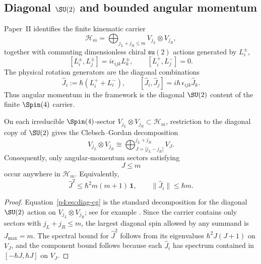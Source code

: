 \documentclass[12pt,a4paper]{article}
\begin{document}
\subsection{Diagonal \texorpdfstring{$\SU(2)$}{SU(2)} and bounded angular momentum}
\label{p4:sec:part2-angular}

Paper~II identifies the finite kinematic carrier
\[
\mathcal H_m
=
\bigoplus_{j_L+j_R\le m} V_{j_L}\otimes V_{j_R},
\]
together with commuting dimensionless chiral \(\mathfrak{su}(2)\) actions generated by \(L_i^\pm\),
\[
[L_i^\pm,L_j^\pm]=i\epsilon_{ijk}L_k^\pm,
\qquad
[L_i^+,L_j^-]=0.
\]
The physical rotation generators are the diagonal combinations
\begin{equation}
\label{p4:eq:Ji}
\hat J_i:=\hbar(L_i^+ + L_i^-),
\qquad
[\hat J_i,\hat J_j]=i\hbar\,\epsilon_{ijk}\hat J_k.
\end{equation}
Thus angular momentum in the framework is the diagonal \(\SU(2)\) content of the finite \(\Spin(4)\) carrier.

\begin{theorem}
\label{p4:thm:angular-cutoff}
On each irreducible \(\Spin(4)\)-sector \(V_{j_L}\otimes V_{j_R}\subset\mathcal H_m\),
restriction to the diagonal copy of \(\SU(2)\) gives the Clebsch--Gordan decomposition
\begin{equation}
\label{p4:eq:diag-cg}
V_{j_L}\otimes V_{j_R}
\cong
\bigoplus_{J=|j_L-j_R|}^{j_L+j_R} V_J.
\end{equation}
Consequently, only angular-momentum sectors satisfying
\begin{equation}
\label{p4:eq:Jmax-m}
J\le m
\end{equation}
occur anywhere in \(\mathcal H_m\).
Equivalently,
\begin{equation}
\label{p4:eq:J2-bound}
\hat J^2 \le \hbar^2 m(m+1)\,\mathbf 1,
\qquad
\|\hat J_i\|\le \hbar m.
\end{equation}
\end{theorem}

\begin{proof}
Equation~\eqref{p4:eq:diag-cg} is the standard decomposition for the diagonal \(\SU(2)\) action on
\(V_{j_L}\otimes V_{j_R}\); see for example \cite{Hall2015lie}.
Since the carrier contains only sectors with \(j_L+j_R\le m\), the largest diagonal spin allowed by any summand is \(J_{\max}=m\).
The spectral bound for \(\hat J^2\) follows from its eigenvalues \(\hbar^2J(J+1)\) on \(V_J\), and the component bound follows because each \(\hat J_i\) has spectrum contained in \([-\hbar J,\hbar J]\) on \(V_J\).
\end{proof}
\end{document}

